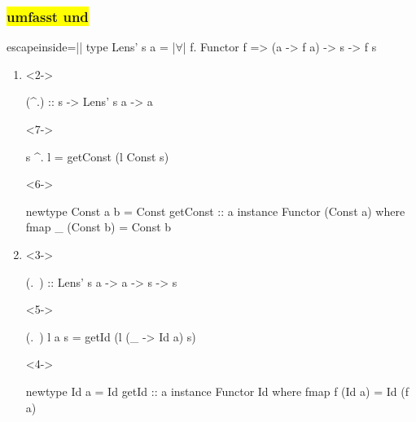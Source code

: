 \documentclass{beamer}
\newcommand{\fa}{$\forall$}
\begin{document}
\begin{frame}[fragile]
  \frametitle{
    \colorbox{yellow}{
       umfasst
        und
       
    }
  }

\begin{haskellcode*}{escapeinside=||}
type Lens' s a = |\fa| f. Functor f => (a -> f a) -> s -> f s
\end{haskellcode*}

  \begin{enumerate}
    \item
    \begin{visibleenv}<2->
\begin{haskellcode}
(^.) :: s -> Lens' s a -> a
\end{haskellcode}
    \end{visibleenv}
    \vspace{-0.8em}
    \begin{visibleenv}<7->
\begin{haskellcode}
s ^. l = getConst (l Const s)
\end{haskellcode}
    \end{visibleenv}

    \begin{visibleenv}<6->
\begin{haskellcode}
newtype Const a b = Const { getConst :: a }
instance Functor (Const a) where
  fmap _ (Const b) = Const b
\end{haskellcode}
    \end{visibleenv}
    \vspace{1em}

    \item
    \begin{visibleenv}<3->
\begin{haskellcode}
(.~) :: Lens' s a -> a -> s -> s
\end{haskellcode}
    \end{visibleenv}
    \vspace{-0.8em}
    \begin{visibleenv}<5->
\begin{haskellcode}
(.~) l a s = getId (l (\_ -> Id a) s)
\end{haskellcode}
    \end{visibleenv}

    \begin{visibleenv}<4->
\begin{haskellcode}
newtype Id a = Id { getId :: a }
instance Functor Id where
  fmap f (Id a) = Id (f a)
\end{haskellcode}
    \end{visibleenv}
  \end{enumerate}
\end{frame}
\end{document}
